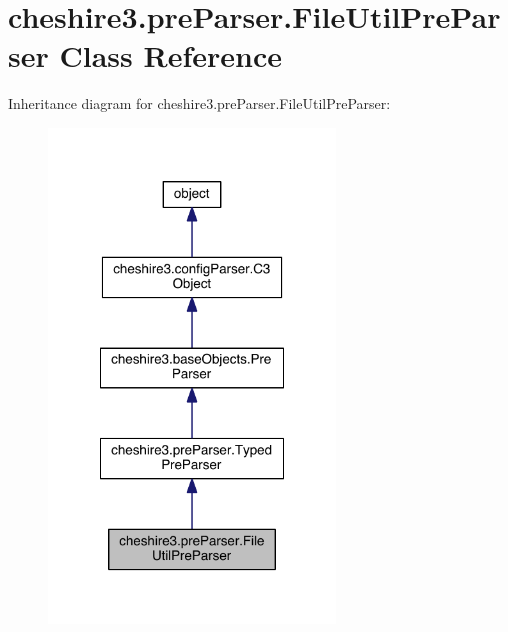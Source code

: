\hypertarget{classcheshire3_1_1pre_parser_1_1_file_util_pre_parser}{\section{cheshire3.\-pre\-Parser.\-File\-Util\-Pre\-Parser Class Reference}
\label{classcheshire3_1_1pre_parser_1_1_file_util_pre_parser}
}


Inheritance diagram for cheshire3.\-pre\-Parser.\-File\-Util\-Pre\-Parser\-:
\nopagebreak
\begin{figure}[H]
\begin{center}
\leavevmode
\includegraphics[width=216pt]{classcheshire3_1_1pre_parser_1_1_file_util_pre_parser__inherit__graph}
\end{center}
\end{figure}


